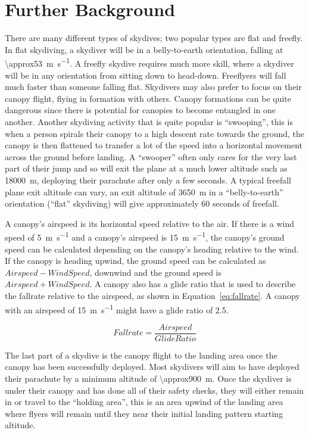 \section{Further Background}\label{sec:further-background}
There are many different types of skydives; two popular types are flat and freefly. In flat skydiving, a skydiver will be in a belly-to-earth orientation, falling at \SI{\approx53}{\metre\per\second}. A freefly skydive requires much more skill, where a skydiver will be in any orientation from sitting down to head-down. Freeflyers will fall much faster than someone falling flat.
Skydivers may also prefer to focus on their canopy flight, flying in formation with others. Canopy formations can be quite dangerous since there is potential for canopies to become entangled in one another.
Another skydiving activity that is quite popular is ``swooping'', this is when a person spirals their canopy to a high descent rate towards the ground, the canopy is then flattened to transfer a lot of the speed into a horizontal movement across the ground before landing. A ``swooper'' often only cares for the very last part of their jump and so will exit the plane at a much lower altitude such as \SI{18000}{\metre}, deploying their parachute after only a few seconds.
A typical freefall plane exit altitude can vary, an exit altitude of \SI{3650}{\metre} in a ``belly-to-earth'' orientation (``flat'' skydiving) will give approximately 60 seconds of freefall.

A canopy's airspeed is its horizontal speed relative to the air. If there is a wind speed of \SI{5}{\metre\per\second} and a canopy's airspeed is \SI{15}{\metre\per\second}, the canopy's ground speed can be calculated depending on the canopy's heading relative to the wind. If the canopy is heading upwind, the ground speed can be calculated as $Airspeed - WindSpeed$, downwind and the ground speed is $Airspeed + WindSpeed$.
A canopy also has a glide ratio that is used to describe the fallrate relative to the airspeed, as shown in Equation~\ref{eq:fallrate}. A canopy with an airspeed of \SI{15}{\metre\per\second} might have a glide ratio of 2.5.

\begin{equation}\label{eq:fallrate}
  Fallrate = \frac{Airspeed}{Glide Ratio}
\end{equation}

The last part of a skydive is the canopy flight to the landing area once the canopy has been successfully deployed. Most skydivers will aim to have deployed their parachute by a minimum altitude of \SI{\approx900}{\metre}.
Once the skydiver is under their canopy and has done all of their safety checks, they will either remain in or travel to the ``holding area'', this is an area upwind of the landing area where flyers will remain until they near their initial landing pattern starting altitude.

